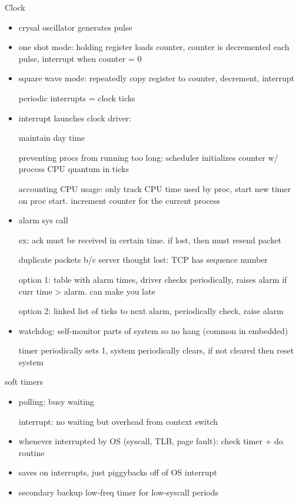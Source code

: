 \documentclass[11pt]{article}
\begin{document}
Clock
\begin{itemize}
    \item crysal oscillator generates pulse
    \item one shot mode: holding register loads counter, counter is decremented each pulse, interrupt when counter = 0
    \item square wave mode: repeatedly copy register to counter, decrement, interrupt

        periodic interrupts = clock ticks

    \item interrupt launches clock driver:

        maintain day time

        preventing procs from running too long: scheduler initializes counter w/ process CPU quantum in ticks

        accounting CPU usage: only track CPU time used by proc, start new timer on proc start.
            increment counter for the current process

    \item alarm sys call

        ex: ack must be received in certain time. if lost, then must resend packet

        duplicate packets b/c server thought lost: TCP has sequence number

        option 1: table with alarm times, driver checks periodically, raises alarm if curr time > alarm.
            can make you late

        option 2: linked list of ticks to next alarm, periodically check, raise alarm

    \item watchdog: self-monitor parts of system so no hang (common in embedded)

        timer periodically sets 1, system periodically clears, if not cleared then reset system
\end{itemize}

soft timers
\begin{itemize}
    \item polling: busy waiting

        interrupt: no waiting but overhead from context switch

    \item whenever interrupted by OS (syscall, TLB, page fault): check timer + do routine

    \item saves on interrupts, just piggybacks off of OS interrupt

    \item secondary backup low-freq timer for low-syscall periods
\end{itemize}
\end{document}
